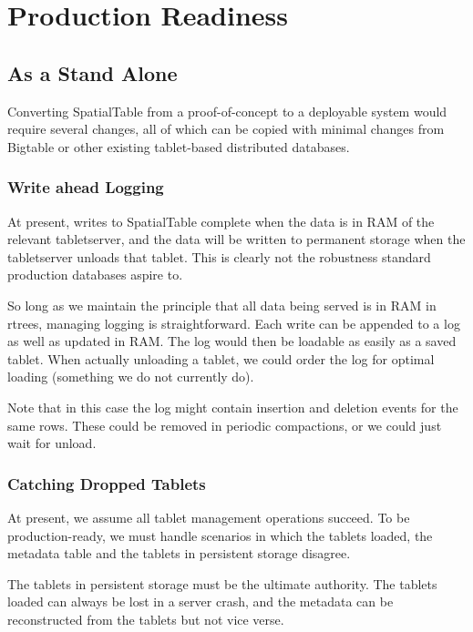 \documentclass[11pt]{article}
\begin{document}
\section{Production Readiness}

\subsection{As a Stand Alone}

Converting SpatialTable from a proof-of-concept to a deployable system would require several changes, all of which can be copied with minimal changes from Bigtable or other existing tablet-based distributed databases.

\subsubsection{Write ahead Logging}

At present, writes to SpatialTable complete when the data is in RAM of the relevant tabletserver, and the data will be written to permanent storage when the tabletserver unloads that tablet.  This is clearly not the robustness standard production databases aspire to.

So long as we maintain the principle that all data being served is in RAM in rtrees, managing logging is straightforward.  Each write can be appended to a log as well as updated in RAM.  The log would then be loadable as easily as a saved tablet.  When actually unloading a tablet, we could order the log for optimal loading (something we do not currently do).

Note that in this case the log might contain insertion and deletion events for the same rows.  These could be removed in periodic compactions, or we could just wait for unload.

\subsubsection{Catching Dropped Tablets}

At present, we assume all tablet management operations succeed.  To be production-ready, we must handle scenarios in which the tablets loaded, the metadata table and the tablets in persistent storage disagree.

The tablets in persistent storage must be the ultimate authority.  The tablets loaded can always be lost in a server crash, and the metadata can be reconstructed from the tablets but not vice verse.
\end{document}
